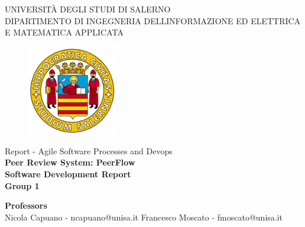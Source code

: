 \begin{titlepage}
    \begin{center}
        \LARGE{\uppercase{Università degli Studi di Salerno}}\\
        \vspace{5mm}
    	\uppercase{\normalsize Dipartimento di Ingegneria dell\textquotesingle Informazione ed Elettrica e Matematica applicata}\\
    \end{center}
    
    \vspace{2mm}
    \begin{figure}[H]
        \centering
        \includegraphics[width=0.35\textwidth]{logo_unisa}
    \end{figure}
    \vspace{2mm}
    
    \begin{center}
    	\normalsize{Report - Agile Software Processes and Devops}\\
    	\vspace{10mm}
        {\huge{\bf Peer Review System: PeerFlow}}\\
        \vspace{2mm}
        {\LARGE{\bf Software Development Report}}\\
        \vspace{2mm}
        {\normalsize{\bf Group 1}}
    \end{center}
    
    \vspace{10mm}
    \noindent
    \begin{center}
            \textbf{Professors}\\
            \vspace{2mm}
            Nicola Capuano - ncapuano@unisa.it
            \vspace{2mm}
            Francesco Moscato - fmoscato@unisa.it
    \end{center}
    

\end{titlepage}
